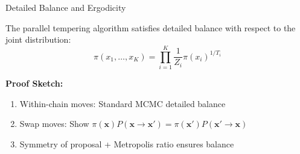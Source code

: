 
\begin{frame}{Detailed Balance and Ergodicity}
	\begin{proposition}
		The parallel tempering algorithm satisfies detailed balance with respect to the joint distribution:
		$$\pi(x_1, \ldots, x_K) = \prod_{i=1}^K \frac{1}{Z_i} \pi(x_i)^{1/T_i}$$
	\end{proposition}

	\textbf{Proof Sketch:}
	\begin{enumerate}
		\item Within-chain moves: Standard MCMC detailed balance
		\item Swap moves: Show $\pi(\mathbf{x}) P(\mathbf{x} \to \mathbf{x}') = \pi(\mathbf{x}') P(\mathbf{x}' \to \mathbf{x})$
		\item Symmetry of proposal + Metropolis ratio ensures balance
	\end{enumerate}

\end{frame}



